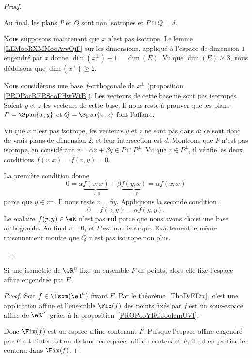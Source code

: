 \begin{proof}
\begin{subproof}
		Au final, les plans \( P\) et \( Q\) sont non isotropes et \( P\cap Q=d\).

		Nous supposons maintenant que \( x\) n'est pas isotrope. Le lemme \ref{LEMooRXMMooAvvOjF} sur les dimensions, appliqué à l'espace de dimension \( 1\) engendré par \( x\) donne  \( \dim(x^{\perp})+1=\dim(E)\). Vu que \( \dim(E)\geq 3\), nous déduisons que \( \dim(x^{\perp})\geq 2\).

		Nous considérons une base \( f\)-orthogonale de \( x^{\perp}\) (proposition \ref{PROPooRERSooFHwWtB}). Les vecteurs de cette base ne sont pas isotropes. Soient \( y\) et \( z\) les vecteurs de cette base. Il nous reste à prouver que les plans \( P=\Span\{ x,y \}\) et \( Q=\Span\{ x,z \}\) font l'affaire.

		Vu que \( x\) n'est pas isotrope, les vecteurs \( y\) et \( z\) ne sont pas dans \( d\); ce sont donc de vrais plans de dimension \( 2\), et leur intersection est \( d\). Montrons que \( P\) n'est pas isotrope, en considérant \( v=\alpha x+\beta y\in P\cap P^{\perp}\). Vu que \( v\in P^{\perp}\), il vérifie les deux conditions \( f(v,x)=f(v,y)=0\).

		La première condition donne
		\begin{equation}
			0=\alpha \underbrace{f(x,x)}_{\neq 0}+\beta \underbrace{f(y,x)}_{=0}= \alpha f(x,x)
		\end{equation}
		parce que \( y\in x^{\perp}\). Il nous reste \( v=\beta y\). Appliquons la seconde condition :
		\begin{equation}
			0= f(v,y)= \alpha f(y,y).
		\end{equation}
		Le scalaire \( f(y,y)\in \eK\) n'est pas nul parce que nous avons choisi une base orthogonale. Au final \( v=0\), et \( P\) est non isotrope. Exactement le même raisonnement montre que \( Q\) n'est pas isotrope non plus.
	\end{subproof}
\end{proof}

\begin{proposition}      \label{PROPooVEEUooJQmmkN}
	Si une isométrie de \( \eR^n\) fixe un ensemble \( F\) de points, alors elle fixe l'espace affine engendrée par \( F\).
\end{proposition}

\begin{proof}
	Soit \( f\in \Isom(\eR^n)\) fixant \( F\). Par le théorème~\ref{ThoDsFErq}, c'est une application affine et l'ensemble \( \Fix(f)\) des points fixés par \( f\) est un sous-espace affine de \( \eR^n\), grâce à la proposition~\ref{PROPooYRCJooIcmUVI}.

	Donc \( \Fix(f)\) est un espace affine contenant \( F\). Puisque l'espace affine engendré par \( F\) est l'intersection de tous les espaces affines contenant \( F\), il est en particulier contenu dans \( \Fix(f)\).
\end{proof}

